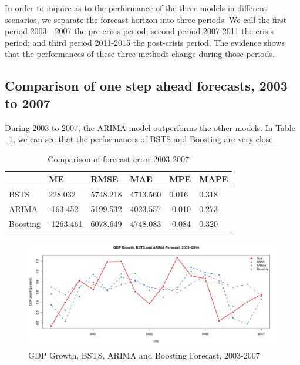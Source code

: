 In order to inquire as to the performance of the three models in different scenarios, we separate the forecast horizon into three periods. We call the first period 2003 - 2007 the pre-crisis period; second period 2007-2011 the crisis period; and third period  2011-2015 the post-crisis period. The evidence shows that the performances of these three methods change during those periods.




\subsection{Comparison of one step ahead forecasts, 2003 to 2007}

During 2003 to 2007, the ARIMA model outperforms the other models. In Table ~\ref{ErrorCom1}, we can see that the performances of BSTS and Boosting are very close. 


\begin{table}[h]
	\centering
	\begin{tabular}{@{}llllll@{}}
		\toprule
				   & ME    & RMSE   & MAE  & MPE & MAPE     \\ \midrule
		BSTS       & 228.032 & 5748.218 & 4713.560 & 0.016 & 0.318 \\
		ARIMA      & -163.452 & 5199.532 & 4023.557 &-0.010 & 0.273  \\ 
		Boosting   & -1263.461 & 6078.649 & 4748.083 & -0.084 & 0.320\\ \bottomrule
	\end{tabular}
	\caption{Comparison of forecast error 2003-2007}
	\label{ErrorCom1}
\end{table}




\begin{figure}[h]
\centering
\includegraphics[width=0.9\linewidth]{Figures/bsts_arima_boost_1}
\caption{GDP Growth, BSTS, ARIMA and Boosting Forecast, 2003-2007}
\label{fig:bsts_arima_boost_1}
\end{figure}


